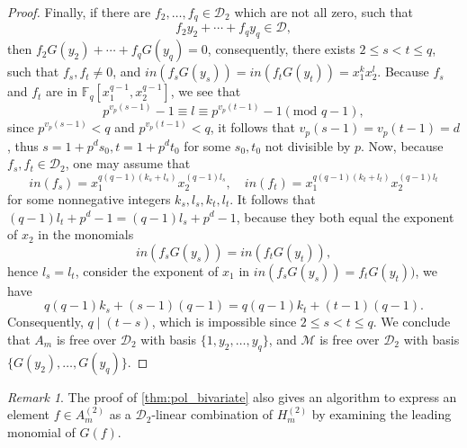 \documentclass[12pt,a4paper]{report}
\theoremstyle{definition}
\theoremstyle{remark}
\newtheorem*{remark}{Remark}
\theoremstyle{definition}
\begin{document}
\begin{proof}
Finally, if there are $f_2, \ldots, f_q\in \mathcal{D}_2$ which are not all zero, such that
\begin{equation*}
    f_2 y_2 + \cdots + f_q y_q\in \mathcal{D},
\end{equation*}
then $f_2 G(y_2) + \cdots + f_q G(y_q) = 0$, consequently, there exists $2\leq s < t \leq q$, such that $f_s, f_t\neq 0$, and $in(f_s G(y_s)) = in(f_t G(y_t)) = x_1^k x_2^l$. Because $f_s$ and $f_t$ are in $\mathbb{F}_q[x_1^{q-1}, x_2^{q-1}]$, we see that 
\begin{equation*}
    p^{v_p(s-1)}-1 \equiv l\equiv p^{v_p(t-1)}-1 (\text{mod }q-1),
\end{equation*}
since $p^{v_p(s-1)}<q$ and $p^{v_p(t-1)}<q$, it follows that $v_p(s-1) = v_p(t-1) = d$, thus $s = 1+p^d s_0, t = 1+p^d t_0$ for some $s_0, t_0$ not divisible by $p$. Now, because $f_s, f_t\in \mathcal{D}_2$, one may assume that 
\begin{equation*}
    in(f_s) = x_1^{q(q-1)(k_s+l_s)}x_2^{(q-1)l_s}, \quad in(f_t) = x_1^{q(q-1)(k_t+l_t)}x_2^{(q-1)l_t}
\end{equation*}
for some nonnegative integers $k_s, l_s, k_t, l_t$. It follows that $(q-1)l_t + p^d - 1 = (q-1)l_s + p^d-1$, because they both equal the exponent of $x_2$ in the monomials
\begin{equation*}
    in(f_s G(y_s))= in(f_t G(y_t)),
\end{equation*}
hence $l_s = l_t$, consider the exponent of $x_1$ in $in(f_s G(y_s)) = f_t G(y_t))$, we have
\begin{equation*}
    q(q-1)k_s + (s-1)(q-1) = q(q-1)k_t + (t-1)(q-1).
\end{equation*}
Consequently, $q\mid (t-s)$, which is impossible since $2\le s<t\le q$. We conclude that $A_m$ is free over $\mathcal{D}_2$ with basis $\{1, y_2, \ldots, y_q\}$, and $\mathcal{M}$ is free over $\mathcal{D}_2$ with basis $\{G(y_2), \ldots, G(y_q)\}$.
\end{proof}
\begin{remark}
    The proof of \cref{thm:pol_bivariate} also gives an algorithm to express an element $f\in A_m^{(2)}$ as a $\mathcal{D}_2$-linear combination of $H_m^{(2)}$ by examining the leading monomial of $G(f)$.
\end{remark}
\end{document}
